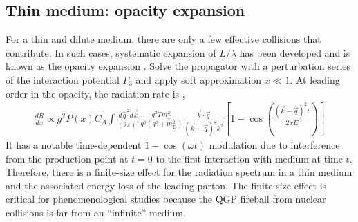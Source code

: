 \subsection{Thin medium: opacity expansion}
For a thin and dilute medium, there are only a few effective collisions that contribute.
In such cases, systematic expansion of  $L/\lambda$ has been developed and is known as the opacity expansion \cite{Wiedemann:2000za,Gyulassy:1999zd,Djordjevic:2008iz}.
Solve the propagator with a perturbation series of the interaction potential $\Gamma_3$ and apply soft approximation $x\ll 1$. 
At leading order in the opacity,  the radiation rate is \cite{Djordjevic:2008iz},
\begin{eqnarray}
\frac{dR}{dx} \propto g^2 P(x) C_A \int \frac{d\vec{q}^2 d\vec{k}}{(2\pi)^4} \frac{g^2 T m_D^2}{q^2(q^2 + m_D^2)} \frac{\vec{k}\cdot\vec{q}}{(\vec{k}-\vec{q})^2 k^2} \left[1-\cos\left(\frac{(\vec{k}-\vec{q})^2 t}{2x E}\right)\right]
\end{eqnarray}
It has a notable time-dependent $1-\cos(\omega t)$ modulation due to interference from the production point at $t=0$ to the first interaction with medium at time $t$.
Therefore, there is a finite-size effect for the radiation spectrum in a thin medium and the associated energy loss of the leading parton.
The finite-size effect is critical for phenomenological studies because the QGP fireball from nuclear collisions is far from an ``infinite'' medium.

